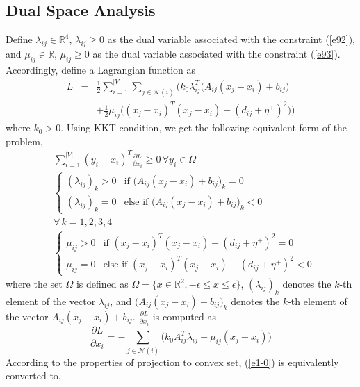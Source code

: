 \documentclass[journal]{IEEEtran}
\begin{document}
\subsection{Dual Space Analysis}
Define $\lambda_{ij}\in\mathbb{R}^4$, $\lambda_{ij}\geq 0$ as the dual variable associated with the constraint (\ref{e92}), and $\mu_{ij}\in\mathbb{R}$, $\mu_{ij}\geq 0$ as the dual variable associated with the constraint (\ref{e93}). Accordingly, define a Lagrangian function as \begin{eqnarray}
L&=&\frac{1}{2}\sum_{i=1}^{|V|}\sum_{j\in\mathcal{N}(i)}\bigg(k_0\lambda_{ij}^T\big(A_{ij}(x_j-x_i)+b_{ij}\big)\nonumber\\
&&+\frac{1}{2}\mu_{ij}\big((x_j-x_i)^T(x_j-x_i)-(d_{ij}+\eta^+)^2\big)\bigg)
\end{eqnarray}
where $k_0>0$. Using KKT condition, we get the following equivalent form of the problem,
\begin{subequations}\label{e1-0}
\begin{align}
&\sum_{i=1}^{|V|}(y_i-x_i)^T\frac{\partial L}{\partial x_i}\geq 0\, \forall y_i\in\Omega\\
&\begin{cases}
   (\lambda_{ij})_k>0        & \text{if } \big(A_{ij}(x_j-x_i)+b_{ij}\big)_k=0 \\
   (\lambda_{ij})_k=0        & \text{else if } \big(A_{ij}(x_j-x_i)+b_{ij}\big)_k<0
  \end{cases}\\
&\forall\,k=1,2,3,4\\
&\begin{cases}
   \mu_{ij}>0        & \text{if } (x_j-x_i)^T(x_j-x_i)-(d_{ij}+\eta^+)^2=0 \\
    \mu_{ij}=0        & \text{else if } (x_j-x_i)^T(x_j-x_i)-(d_{ij}+\eta^+)^2<0
  \end{cases}
\end{align}
\end{subequations}
where the set $\Omega$ is defined as $\Omega=\{x\in\mathbb{R}^2, -\epsilon\leq x\leq \epsilon\}$, $(\lambda_{ij})_k$ denotes the $k$-th element of the vector $\lambda_{ij}$, and $\big(A_{ij}(x_j-x_i)+b_{ij}\big)_k$ denotes the $k$-th element of the vector $A_{ij}(x_j-x_i)+b_{ij}$. $\frac{\partial L}{\partial x_i}$ is computed as
\begin{equation}\label{e1-01}
\frac{\partial L}{\partial x_i}=-\sum_{j\in\mathcal{N}(i)}\big(k_0A^T_{ij}\lambda_{ij}+\mu_{ij}(x_j-x_i)\big)
\end{equation}
According to the properties of projection to convex set, (\ref{e1-0}) is equivalently converted to,
\end{document}
